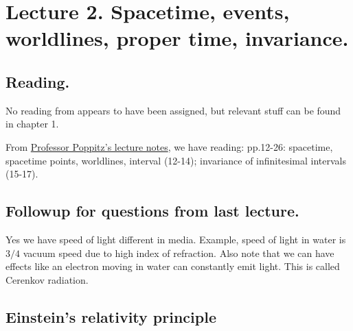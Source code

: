 %
%

\chapter{Lecture 2.  Spacetime, events, worldlines, proper time, invariance.}
\label{chap:relativisticElectrodynamicsL2}
{}
\date{Jan 12, 2011}

\beginArtNoToc

\section{Reading.}

No reading from \cite{landau1980classical} appears to have been assigned, but relevant stuff can be found in chapter 1.

From \href{http://www.physics.utoronto.ca/~poppitz/e-poppitz/PHY450_files/RelEM12-26.pdf}{Professor Poppitz's lecture notes}, we have reading: pp.12-26: spacetime, spacetime points, worldlines, interval (12-14); invariance of infinitesimal intervals (15-17).

\section{Followup for questions from last lecture.}

Yes we have speed of light different in media.  Example, speed of light in water is $3/4$ vacuum speed due to high index of refraction.  Also note that we can have effects like an electron moving in water can constantly emit light.  This is called Cerenkov radiation.

\section{Einstein's relativity principle}

